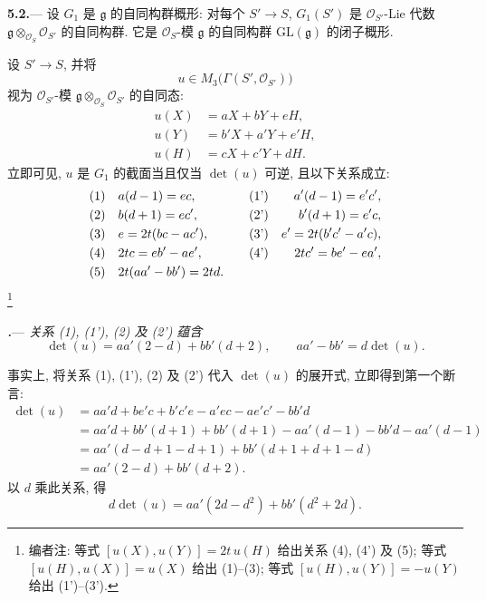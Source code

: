 \par\medskip\noindent
\textbf{5.2.}---
设 \(G_1\) 是 \(\mathfrak g\) 的自同构群概形: 对每个 \(S'\to S\), \(G_1(S')\) 是 \(\mathcal O_{S'}\)-Lie 代数 \(\mathfrak g\otimes_{\mathcal O_S}\mathcal O_{S'}\) 的自同构群. 它是 \(\mathcal O_S\)-模 \(\mathfrak g\) 的自同构群 \(\mathrm{GL}(\mathfrak g)\) 的闭子概形.

设 \(S'\to S\), 并将
\[
  u\in M_3\bigl(\Gamma(S',\mathcal O_{S'})\bigr)
\]
视为 \(\mathcal O_{S'}\)-模 \(\mathfrak g\otimes_{\mathcal O_S}\mathcal O_{S'}\) 的自同态:
\[
  \begin{aligned}
  u(X)&=aX+bY+eH,\\
  u(Y)&=b'X+a'Y+e'H,\\
  u(H)&=cX+c'Y+dH.
  \end{aligned}
\]
立即可见, \(u\) 是 \(G_1\) 的截面当且仅当 \(\det(u)\) 可逆, 且以下关系成立:
\[
\begin{alignedat}{4}
  \textup{(1)}\quad&a(d-1)=ec,
  &\qquad&
  \textup{(1')}\quad&a'(d-1)=e'c',\\
  \textup{(2)}\quad&b(d+1)=ec',
  &&
  \textup{(2')}\quad&b'(d+1)=e'c,\\
  \textup{(3)}\quad&e=2t(bc-ac'),
  &&
  \textup{(3')}\quad&e'=2t(b'c'-a'c),\\
  \textup{(4)}\quad&2tc=eb'-ae',
  &&
  \textup{(4')}\quad&2tc'=be'-ea',\\
  \textup{(5)}\quad&2t(aa'-bb')=2td.&&&
\end{alignedat}
\]
\footnote{编者注: 等式 \([u(X),u(Y)]=2t\,u(H)\) 给出关系 \textup{(4)}, \textup{(4')} 及 \textup{(5)}; 等式 \([u(H),u(X)]=u(X)\) 给出 \textup{(1)--(3)}; 等式 \([u(H),u(Y)]=-u(Y)\) 给出 \textup{(1')--(3')}.}

\par\medskip\noindent
{}\textbf{\textit{.}}---
\textit{关系 \textup{(1)}, \textup{(1')}, \textup{(2)} 及 \textup{(2')} 蕴含}
\[
  \det(u)=aa'(2-d)+bb'(d+2),
  \qquad
  aa'-bb'=d\det(u).
\]

事实上, 将关系 \textup{(1)}, \textup{(1')}, \textup{(2)} 及 \textup{(2')} 代入 \(\det(u)\) 的展开式, 立即得到第一个断言:
\[
\begin{aligned}
  \det(u)
  &=aa'd+be'c+b'c'e-a'ec-ae'c'-bb'd\\
  &=aa'd+bb'(d+1)+bb'(d+1)
    -aa'(d-1)-bb'd-aa'(d-1)\\
  &=aa'(d-d+1-d+1)+bb'(d+1+d+1-d)\\
  &=aa'(2-d)+bb'(d+2).
\end{aligned}
\]
以 \(d\) 乘此关系, 得
\[
  d\det(u)=aa'(2d-d^2)+bb'(d^2+2d).
\]

